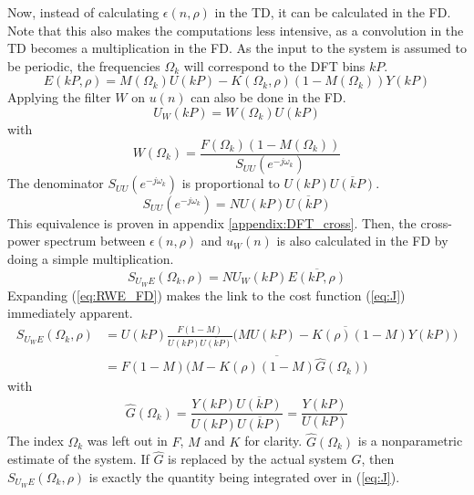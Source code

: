 Now, instead of calculating $\epsilon(n,\rho)$ in the TD, it can be calculated in the FD. Note that this also makes the computations less intensive, as a convolution in the TD becomes a multiplication in the FD. As the input to the system is assumed to be periodic, the frequencies $\Omega_k$ will correspond to the DFT bins $kP$.
\begin{equation*}
    E(kP,\rho) = M(\Omega_k) U(kP) - K(\Omega_k,\rho) (1-M(\Omega_k)) Y(kP)
\end{equation*}
Applying the filter $W$ on $u(n)$ can also be done in the FD.
\begin{equation*}
    U_W(kP) = W(\Omega_k) U(kP)
\end{equation*}
with
\begin{equation*}
    W(\Omega_k) = \frac{F(\Omega_k)(1-M(\Omega_k))}{S_{UU}(e^{-j \omega_k})}
\end{equation*}
The denominator $S_{UU}(e^{-j \omega_k})$ is proportional to $U(kP)\overline{U(kP)}$.
\begin{equation}
S_{UU}(e^{-j \omega_k}) = N U(kP)\overline{U(kP)}
\label{eq:Suu=NUU}
\end{equation}
This equivalence is proven in appendix \ref{appendix:DFT_cross}. Then, the cross-power spectrum between $\epsilon(n,\rho)$ and $u_W(n)$ is also calculated in the FD by doing a simple multiplication.
\begin{equation}
    S_{U_W\!E}(\Omega_k,\rho) = N U_W(kP) \overline{E(kP,\rho)}
    \label{eq:RWE_FD}
\end{equation}
Expanding (\ref{eq:RWE_FD}) makes the link to the cost function (\ref{eq:J}) immediately apparent.
\begin{align}
    S_{U_W\!E}(\Omega_k,\rho) &= U(kP) \frac{F(1-M)}{U(kP)\overline{U(kP)}}  \overline{ \big(M U(kP) - K(\rho) (1-M) Y(kP) \big)} \label{eq:PhiUwepsilon_FD}\\
    &= F (1-M) \overline{\big( M - K(\rho) (1-M)\hat{G}(\Omega_k) \big)}
    \label{eq:cross-power_in_FD}
\end{align}
with 
\begin{equation}
    \hat{G}(\Omega_k) = \frac{Y(kP) \overline{U(kP)}}{U(kP) \overline{U(kP)}} = \frac{Y(kP)}{U(kP)}
    \label{eq:Ghat=YU/UU}
\end{equation}
The index $\Omega_k$ was left out in $F$, $M$ and $K$ for clarity.
$\hat{G}(\Omega_k)$ is a nonparametric estimate of the system. If $\hat{G}$ is replaced by the actual system $G$, then $S_{U_W\!E}(\Omega_k,\rho)$ is exactly the quantity being integrated over in (\ref{eq:J}).

